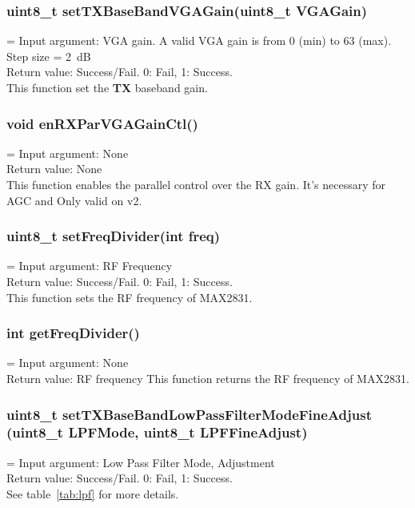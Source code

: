 \subsubsection{uint8\_t setTXBaseBandVGAGain(uint8\_t VGAGain)}
\hangindent=\parindent
{}
Input argument: VGA gain. A valid VGA gain is from 0 (min) to 63 (max). Step size = 2~dB\\
Return value: Success/Fail. 0: Fail, 1: Success.\\
This function set the {\bf TX} baseband gain.

\subsubsection{void enRXParVGAGainCtl()}
\hangindent=\parindent
{}
Input argument: None\\
Return value: None\\
This function enables the parallel control over the RX gain. It's necessary for AGC and Only 
valid on \sdr v2.

\subsubsection{uint8\_t setFreqDivider(int freq)}
\hangindent=\parindent
{}
Input argument: RF Frequency\\
Return value: Success/Fail. 0: Fail, 1: Success.\\
This function sets the RF frequency of MAX2831.

\subsubsection{int getFreqDivider()}
\hangindent=\parindent
{}
Input argument: None\\
Return value: RF frequency
This function returns the RF frequency of MAX2831.

\begin{comment}
\subsubsection{uint8\_t setBaseBandLowPassFilterMode (uint8\_t LPFMode)}
\hangindent=\parindent
\hangafter=0
Input argument: Low Pass Filter Mode\\
Return value: Success/Fail. 0: Fail, 1: Success.\\
\end{comment}

\subsubsection{uint8\_t setTXBaseBandLowPassFilterModeFineAdjust (uint8\_t LPFMode, uint8\_t LPFFineAdjust)}
\hangindent=\parindent
{}
Input argument: Low Pass Filter Mode, Adjustment\\
Return value: Success/Fail. 0: Fail, 1: Success.\\
See table~\ref{tab:lpf} for more details.

